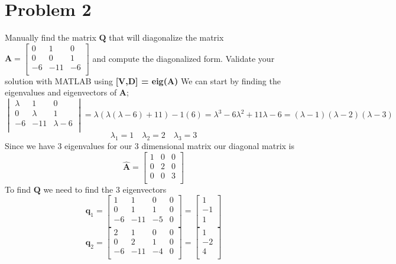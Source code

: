 \documentclass{article}
\begin{document}
\section*{Problem 2}
Manually find the matrix $\mathbf{Q}$ that will diagonalize the matrix
$
\mathbf{A}
=
\begin{bmatrix}
0 & 1 & 0 \\
0 & 0 & 1 \\
-6&-11&-6 \\
\end{bmatrix}
$
and compute the diagonalized form.
Validate your solution with MATLAB using {\bf [V,D] = eig(A)}
\newline
\newline
We can start by finding the eigenvalues and eigenvectors of $\mathbf{A}$;
$$
\begin{vmatrix}
\lambda & 1 & 0 \\
0 & \lambda & 1 \\
-6&-11&\lambda-6 \\
\end{vmatrix}
=\lambda (\lambda(\lambda-6) + 11) - 1(6)
=\lambda^3-6\lambda^2+11\lambda -6
=(\lambda-1)(\lambda-2)(\lambda-3)
$$
$$
\lambda_1 = 1 \quad
\lambda_2 = 2 \quad
\lambda_3 = 3
$$
Since we have 3 eigenvalues for our 3 dimensional matrix our diagonal matrix is
$$
\mathbf{\hat{A}}
=
\begin{bmatrix}
1 & 0 & 0 \\
0 & 2 & 0 \\
0 & 0 & 3 \\
\end{bmatrix}
$$
To find $\mathbf{Q}$ we need to find the 3 eigenvectors
$$
\mathbf{q}_1
=
\left[
\begin{array}{ccc|c}
1 & 1 & 0  & 0\\
0 & 1 & 1  & 0\\
-6&-11& -5 & 0\\
\end{array}
\right]
=
\begin{bmatrix}
1 \\
-1 \\
1 \\
\end{bmatrix}
$$
$$
\mathbf{q}_2
=
\left[
\begin{array}{ccc|c}
2 & 1 & 0  & 0\\
0 & 2 & 1  & 0\\
-6&-11& -4 & 0\\
\end{array}
\right]
=
\begin{bmatrix}
1 \\
-2 \\
4 \\
\end{bmatrix}
$$
\end{document}
